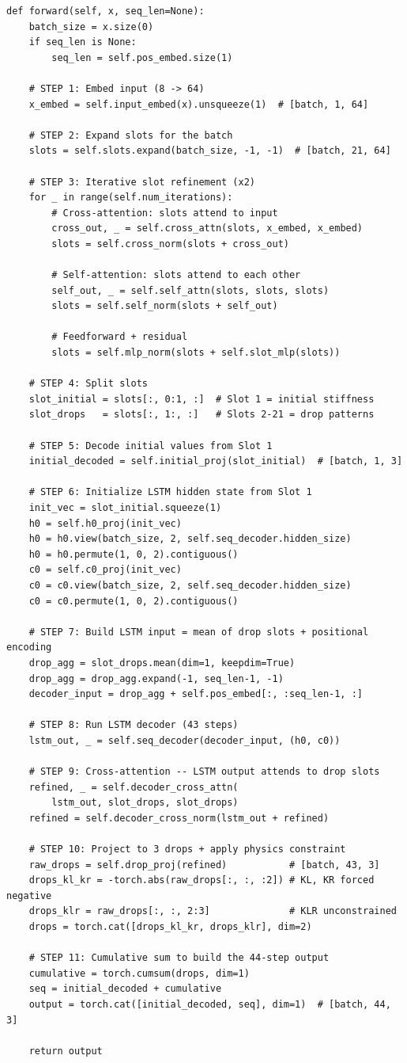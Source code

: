 \documentclass[11pt,a4paper]{article}
\begin{document}
\begin{lstlisting}
def forward(self, x, seq_len=None):
    batch_size = x.size(0)
    if seq_len is None:
        seq_len = self.pos_embed.size(1)

    # STEP 1: Embed input (8 -> 64)
    x_embed = self.input_embed(x).unsqueeze(1)  # [batch, 1, 64]

    # STEP 2: Expand slots for the batch
    slots = self.slots.expand(batch_size, -1, -1)  # [batch, 21, 64]

    # STEP 3: Iterative slot refinement (x2)
    for _ in range(self.num_iterations):
        # Cross-attention: slots attend to input
        cross_out, _ = self.cross_attn(slots, x_embed, x_embed)
        slots = self.cross_norm(slots + cross_out)

        # Self-attention: slots attend to each other
        self_out, _ = self.self_attn(slots, slots, slots)
        slots = self.self_norm(slots + self_out)

        # Feedforward + residual
        slots = self.mlp_norm(slots + self.slot_mlp(slots))

    # STEP 4: Split slots
    slot_initial = slots[:, 0:1, :]  # Slot 1 = initial stiffness
    slot_drops   = slots[:, 1:, :]   # Slots 2-21 = drop patterns

    # STEP 5: Decode initial values from Slot 1
    initial_decoded = self.initial_proj(slot_initial)  # [batch, 1, 3]

    # STEP 6: Initialize LSTM hidden state from Slot 1
    init_vec = slot_initial.squeeze(1)
    h0 = self.h0_proj(init_vec)
    h0 = h0.view(batch_size, 2, self.seq_decoder.hidden_size)
    h0 = h0.permute(1, 0, 2).contiguous()
    c0 = self.c0_proj(init_vec)
    c0 = c0.view(batch_size, 2, self.seq_decoder.hidden_size)
    c0 = c0.permute(1, 0, 2).contiguous()

    # STEP 7: Build LSTM input = mean of drop slots + positional encoding
    drop_agg = slot_drops.mean(dim=1, keepdim=True)
    drop_agg = drop_agg.expand(-1, seq_len-1, -1)
    decoder_input = drop_agg + self.pos_embed[:, :seq_len-1, :]

    # STEP 8: Run LSTM decoder (43 steps)
    lstm_out, _ = self.seq_decoder(decoder_input, (h0, c0))

    # STEP 9: Cross-attention -- LSTM output attends to drop slots
    refined, _ = self.decoder_cross_attn(
        lstm_out, slot_drops, slot_drops)
    refined = self.decoder_cross_norm(lstm_out + refined)

    # STEP 10: Project to 3 drops + apply physics constraint
    raw_drops = self.drop_proj(refined)           # [batch, 43, 3]
    drops_kl_kr = -torch.abs(raw_drops[:, :, :2]) # KL, KR forced negative
    drops_klr = raw_drops[:, :, 2:3]              # KLR unconstrained
    drops = torch.cat([drops_kl_kr, drops_klr], dim=2)

    # STEP 11: Cumulative sum to build the 44-step output
    cumulative = torch.cumsum(drops, dim=1)
    seq = initial_decoded + cumulative
    output = torch.cat([initial_decoded, seq], dim=1)  # [batch, 44, 3]

    return output
\end{lstlisting}
\end{document}
